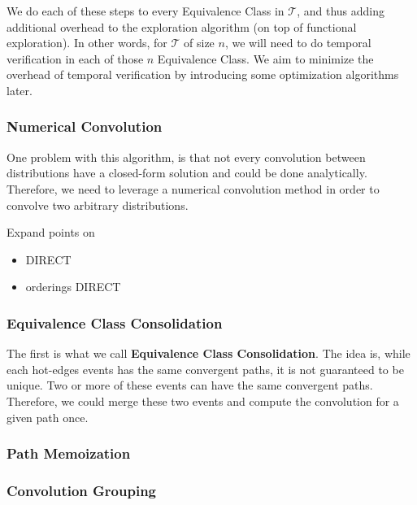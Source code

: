 \documentclass[10pt,sigconf,letterpaper,anonymous,nonacm]{acmart}
\begin{document}
We do each of these steps to every Equivalence Class in $\mathcal{T}$, and thus adding additional 
overhead to the exploration algorithm (on top of functional exploration).
In other words, for $\mathcal{T}$ of size $n$, we will need to do temporal verification in each of 
those $n$ Equivalence Class.
We aim to minimize the overhead of temporal verification by introducing some optimization algorithms
later.

\subsubsection{Numerical Convolution}
One problem with this algorithm, is that not every convolution between distributions have a 
closed-form solution and could be done analytically.
Therefore, we need to leverage a numerical convolution method in order to convolve two arbitrary
distributions.

Expand points on 
\begin{itemize}
    \item DIRECT 
    \item orderings DIRECT
\end{itemize}

\subsubsection{Equivalence Class Consolidation}
The first is what we call \textbf{Equivalence Class Consolidation}. 
The idea is, while each hot-edges events has the same convergent paths, it is not guaranteed to be 
unique. 
Two or more of these events can have the same convergent paths.
Therefore, we could merge these two events and compute the convolution for a given path once.

\subsubsection{Path Memoization}

\subsubsection{Convolution Grouping}

\end{document}
